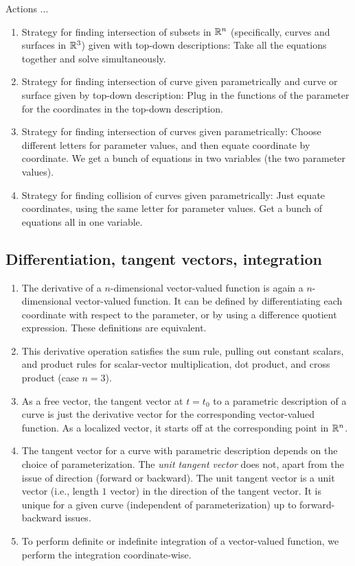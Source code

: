 \documentclass[10pt]{amsart}
\begin{document}
Actions ...

\begin{enumerate}
\item Strategy for finding intersection of subsets in $\mathbb{R}^n$
  (specifically, curves and surfaces in $\mathbb{R}^3$) given with top-down
  descriptions: Take all the equations together and solve
  simultaneously.
\item Strategy for finding intersection of curve given parametrically
  and curve or surface given by top-down description: Plug in the
  functions of the parameter for the coordinates in the top-down description.
\item Strategy for finding intersection of curves given
  parametrically: Choose different letters for parameter values, and
  then equate coordinate by coordinate. We get a bunch of equations in
  two variables (the two parameter values).
\item Strategy for finding collision of curves given parametrically:
  Just equate coordinates, using the same letter for parameter
  values. Get a bunch of equations all in one variable.
\end{enumerate}

\subsection{Differentiation, tangent vectors, integration}

\begin{enumerate}
\item The derivative of a $n$-dimensional vector-valued function is
  again a $n$-dimensional vector-valued function. It can be defined by
  differentiating each coordinate with respect to the parameter, or by
  using a difference quotient expression. These definitions are
  equivalent.
\item This derivative operation satisfies the sum rule, pulling out
  constant scalars, and product rules for scalar-vector
  multiplication, dot product, and cross product (case $n = 3$).
\item As a free vector, the tangent vector at $t = t_0$ to a
  parametric description of a curve is just the derivative vector for
  the corresponding vector-valued function. As a localized vector, it
  starts off at the corresponding point in $\mathbb{R}^n$.
\item The tangent vector for a curve with parametric description
  depends on the choice of parameterization. The {\em unit tangent
  vector} does not, apart from the issue of direction (forward or
  backward). The unit tangent vector is a unit vector (i.e., length
  $1$ vector) in the direction of the tangent vector. It is unique for
  a given curve (independent of parameterization) up to
  forward-backward issues.
\item To perform definite or indefinite integration of a vector-valued
  function, we perform the integration coordinate-wise.
\end{enumerate}
\end{document}
